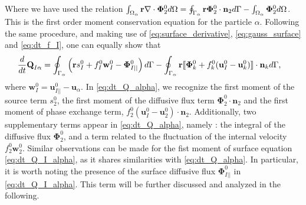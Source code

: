 Where we have used the relation $\int_{\Omega_\alpha} \textbf{r}  \mathbf{\nabla}\cdot \bm\Phi_2^0  d\Omega
= \oint_{\Gamma_\alpha}  \textbf{r} \bm\Phi_2^0 \cdot \textbf{n}_2  d\Gamma
- \int_{\Omega_\alpha}  \bm\Phi_2^0  d\Omega$. 
This is the first order moment conservation equation for the particle $\alpha$. 
Following the same procedure, and making use of \ref{eq:surface_derivative}, \ref{eq:gauss_surface} and \ref{eq:dt_f_I}, one can equally show that 
\begin{align}
    \frac{d}{dt} {\textbf{Q}_{I\alpha}}
    &= \oint_{\Gamma_\alpha}  \left(
        \textbf{r}s_I^0
        + f_I^0 \textbf{w}_I^0
        - \mathbf{\Phi}_{I||}^0
    \right)  d\Gamma
    - \oint_{\Gamma_\alpha} \textbf{r} 
    \llbracket \mathbf{\Phi}_k^0
        + f_k^0 (\textbf{u}_I^0 - \textbf{u}_k^0)
     \rrbracket \cdot \textbf{n}_k
     d\Gamma,
    \label{eq:dt_Q_I_alpha}
\end{align}
where $\textbf{w}_I^0 = \textbf{u}_{I||}^0 - \textbf{u}_\alpha$.
In \ref{eq:dt_Q_alpha}, we recognize the first moment of the source term $s_2^0$, the first moment of the diffusive flux term $\bm\Phi_2^0\cdot\textbf{n}_2$ and the first moment of phase exchange term, $f_2^0 (\textbf{u}_I^0-\textbf{u}_2^0)\cdot\textbf{n}_2$. 
Additionally, two supplementary terms appear in \ref{eq:dt_Q_alpha}, namely : the integral of the diffusive flux $\bm\Phi_2^0$, and a term related to the fluctuation of the internal velocity $f_2^0 \textbf{w}_2^0$.
Similar observations can be made for the fist moment of surface equation \ref{eq:dt_Q_I_alpha}, as it shares similarities with \ref{eq:dt_Q_alpha}. 
In particular, it is worth noting the presence of the surface diffusive flux $\mathbf{\Phi}_{I||}^0$ in \ref{eq:dt_Q_I_alpha}.
This term will be further discussed and analyzed in the following. 

